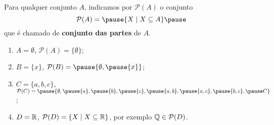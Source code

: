 \documentclass{beamer}
\begin{document}
    \begin{frame}
        \begin{definicao}
            Para qualquer conjunto $A$, \pause indicamos por $\mathcal{P}(A)$ \pause o conjunto\pause
            \[
                \mathcal{P}(A) = \pause \{ X \mid X\subseteq A\}\pause
            \]
            que \'e chamado de \textbf{conjunto das partes} de $A$.\pause
        \end{definicao}


        \begin{exemplos}
            \begin{enumerate}[label={\arabic*})]
                \item $A = \emptyset$, \pause $\mathcal{P}(A) = \{\emptyset\}$;\pause
                \item $B = \{x\}$, \pause $\mathcal{P}(B) = \pause \{\emptyset, \pause \{x\}\}$;\pause
                \item $C = \{a,b,c\}$, \pause $\mathcal{P}(C) = \pause \{\emptyset, \pause\{a\}, \pause\{b\}, \pause\{c\}, \pause\{a,b\}, \pause\{a,c\}, \pause\{b,c\}, \pause C\}$;\pause
                \item $D=\mathbb{R}$, \pause $\mathcal{P}(D) = \{X \mid X \subseteq \mathbb{R}\}$, \pause por exemplo $\mathbb{Q} \in \mathcal{P}(D)$.
            \end{enumerate} 
        \end{exemplos}
    \end{frame}
\end{document}

